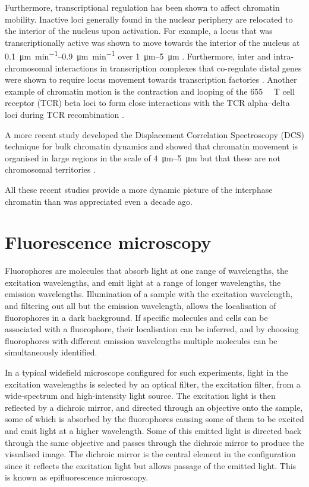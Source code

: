     Furthermore, transcriptional regulation has been shown to affect
    chromatin mobility.  Inactive loci generally found in the nuclear
    periphery are relocated to the interior of the nucleus upon
    activation.  For example, a locus that was transcriptionally active
    was shown to move towards the interior of the nucleus at
    \SIrange{0.1}{0.9}{\micro\meter\per\minute} over
    \SIrange{1}{5}{\micro\meter} \citep{chuang2006long}.  Furthermore, inter
    and intra-chromosomal interactions in transcription complexes that
    co-regulate distal genes were shown to require locus movement
    towards transcription factories \citep{osborne2004active}.
    Another example of chromatin motion is the contraction and looping of the
    \SI{655}{\kilo\bp} T cell receptor (TCR) beta loci to form close
    interactions with the TCR alpha--delta loci during TCR
    recombination \citep{skok2007reversible}.

    A more recent study developed the Displacement
    Correlation Spectroscopy (DCS) technique for bulk chromatin dynamics and
    showed that chromatin movement is organised in large regions in the
    scale of \SIrange{4}{5}{\micro\meter} but that these are not
    chromosomal territories \citep{zidovska2013micron}.

    All these recent studies provide a more dynamic picture of the
    interphase chromatin than was appreciated even a decade ago.

\section{Fluorescence microscopy}

  Fluorophores are molecules that absorb light at one range of
  wavelengths, the excitation wavelengths, and emit light at a range
  of longer wavelengths, the emission wavelengths.  Illumination of a
  sample with the excitation wavelength, and filtering out all but the
  emission wavelength, allows the localisation of fluorophores in a
  dark background.  If specific molecules and cells can be associated
  with a fluorophore, their localisation can be inferred, and by
  choosing fluorophores with different emission wavelengths multiple
  molecules can be simultaneously identified.

  In a typical widefield microscope configured for such experiments,
  light in the excitation wavelengths is selected by an optical
  filter, the excitation filter, from a wide-spectrum and
  high-intensity light source.  The excitation light is then reflected
  by a dichroic mirror, and directed through an objective onto the
  sample, some of which is absorbed by the fluorophores causing some
  of them to be excited and emit light at a higher wavelength.  Some
  of this emitted light is directed back through the same objective
  and passes through the dichroic mirror to produce the visualised
  image.  The dichroic mirror is the central element in the
  configuration since it reflects the excitation light but allows
  passage of
  the emitted light.  This is known as epifluorescence microscopy.

